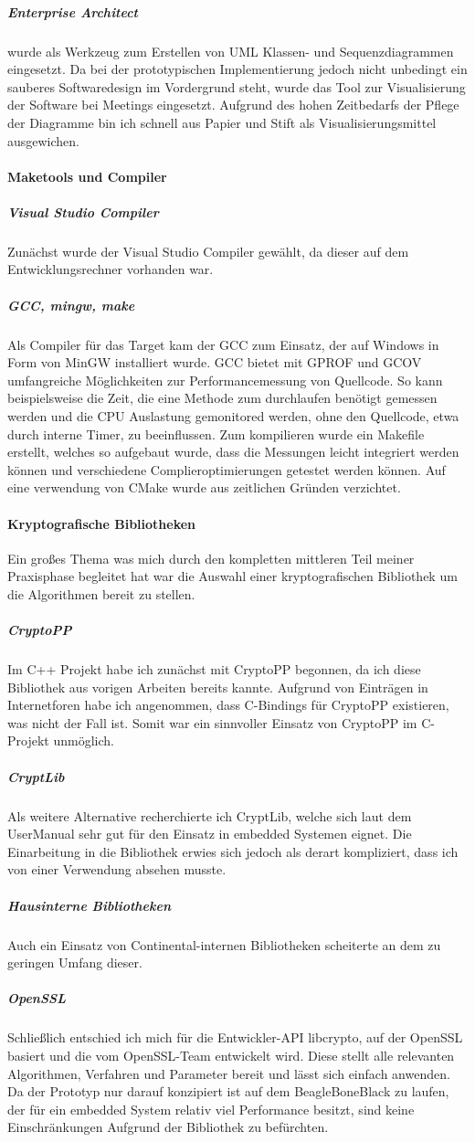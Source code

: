 \subparagraph{Enterprise Architect}
wurde  als Werkzeug zum Erstellen von UML Klassen- und Sequenzdiagrammen eingesetzt. Da bei der prototypischen Implementierung jedoch nicht unbedingt ein sauberes Softwaredesign im Vordergrund steht, wurde das Tool zur Visualisierung der Software bei Meetings eingesetzt. Aufgrund des hohen Zeitbedarfs der Pflege der Diagramme bin ich schnell aus Papier und Stift als Visualisierungsmittel ausgewichen.
\paragraph{Maketools und Compiler}
\subparagraph{Visual Studio Compiler}
Zunächst wurde der Visual Studio Compiler gewählt, da dieser auf dem Entwicklungsrechner vorhanden war. 

\subparagraph{GCC, mingw, make}
Als Compiler für das Target kam der GCC zum Einsatz, der auf Windows in Form von MinGW installiert wurde. 
GCC bietet mit GPROF  und GCOV umfangreiche Möglichkeiten zur Performancemessung von Quellcode. So kann beispielsweise die Zeit, die eine Methode zum durchlaufen benötigt gemessen werden und die CPU Auslastung gemonitored werden, ohne den Quellcode, etwa durch interne Timer, zu beeinflussen.
Zum kompilieren wurde ein Makefile erstellt, welches so aufgebaut wurde, dass die Messungen leicht integriert werden können und verschiedene Complieroptimierungen getestet werden können. 
Auf eine verwendung von CMake wurde aus zeitlichen Gründen verzichtet. 


\paragraph{Kryptografische Bibliotheken}
Ein großes Thema was mich durch den kompletten mittleren Teil meiner Praxisphase begleitet hat war die Auswahl einer kryptografischen Bibliothek um die Algorithmen bereit zu stellen.
\subparagraph{CryptoPP}Im C++ Projekt habe ich zunächst mit CryptoPP begonnen, da ich diese Bibliothek aus vorigen Arbeiten bereits kannte. Aufgrund von Einträgen in Internetforen habe ich angenommen, dass C-Bindings für CryptoPP existieren, was nicht der Fall ist. Somit war ein sinnvoller Einsatz von CryptoPP im C-Projekt unmöglich. 
\subparagraph{CryptLib}Als weitere Alternative recherchierte ich CryptLib, welche sich laut dem UserManual sehr gut für den Einsatz in embedded Systemen eignet. Die Einarbeitung in die Bibliothek erwies sich jedoch als derart kompliziert, dass ich von einer Verwendung absehen musste. 
\subparagraph{Hausinterne Bibliotheken}Auch ein Einsatz von Continental-internen Bibliotheken scheiterte an dem zu geringen Umfang dieser. 
\subparagraph{OpenSSL}Schließlich entschied ich mich für die Entwickler-API libcrypto, auf der OpenSSL basiert und die vom OpenSSL-Team entwickelt wird. Diese stellt alle relevanten Algorithmen, Verfahren und Parameter bereit und lässt sich einfach anwenden. Da der Prototyp nur darauf konzipiert ist auf dem BeagleBoneBlack zu laufen, der für ein embedded System relativ viel Performance besitzt, sind keine Einschränkungen Aufgrund der Bibliothek zu befürchten.


